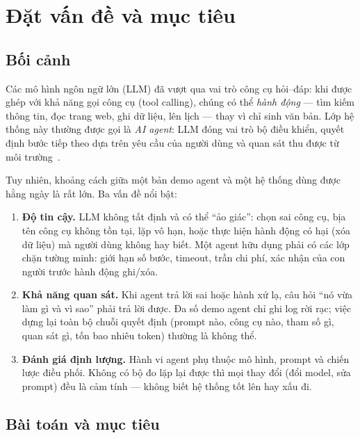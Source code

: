 \section{Đặt vấn đề và mục tiêu}
\label{sec:van-de}

\subsection{Bối cảnh}

Các mô hình ngôn ngữ lớn (LLM) đã vượt qua vai trò công cụ hỏi--đáp: khi được
ghép với khả năng gọi công cụ (tool calling), chúng có thể \emph{hành động} ---
tìm kiếm thông tin, đọc trang web, ghi dữ liệu, lên lịch --- thay vì chỉ sinh
văn bản. Lớp hệ thống này thường được gọi là \emph{AI agent}: LLM đóng vai trò
bộ điều khiển, quyết định bước tiếp theo dựa trên yêu cầu của người dùng và
quan sát thu được từ môi trường~\cite{yao2023react,wang2024agentsurvey}.

Tuy nhiên, khoảng cách giữa một bản demo agent và một hệ thống dùng được hằng
ngày là rất lớn. Ba vấn đề nổi bật:

\begin{enumerate}
  \item \textbf{Độ tin cậy.} LLM không tất định và có thể ``ảo giác'': chọn sai
        công cụ, bịa tên công cụ không tồn tại, lặp vô hạn, hoặc thực hiện hành
        động có hại (xóa dữ liệu) mà người dùng không hay biết. Một agent hữu
        dụng phải có các lớp chặn tường minh: giới hạn số bước, timeout, trần
        chi phí, xác nhận của con người trước hành động ghi/xóa.
  \item \textbf{Khả năng quan sát.} Khi agent trả lời sai hoặc hành xử lạ, câu
        hỏi ``nó vừa làm gì và vì sao'' phải trả lời được. Đa số demo agent chỉ
        ghi log rời rạc; việc dựng lại toàn bộ chuỗi quyết định (prompt nào,
        công cụ nào, tham số gì, quan sát gì, tốn bao nhiêu token) thường là
        không thể.
  \item \textbf{Đánh giá định lượng.} Hành vi agent phụ thuộc mô hình, prompt
        và chiến lược điều phối. Không có bộ đo lặp lại được thì mọi thay đổi
        (đổi model, sửa prompt) đều là cảm tính --- không biết hệ thống tốt lên
        hay xấu đi.
\end{enumerate}

\subsection{Bài toán và mục tiêu}

